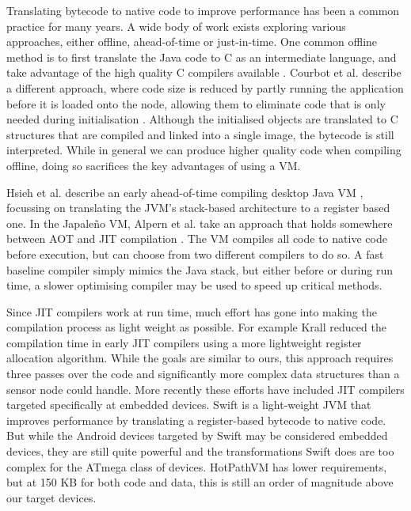 Translating bytecode to native code to improve performance has been a common practice for many years. A wide body of work exists exploring various approaches, either offline, ahead-of-time  or just-in-time. One common offline method is to first translate the Java code to C as an intermediate language, and take advantage of the high quality C compilers available \cite{Dean:1996wb, Muller:1997}. Courbot et al. describe a different approach, where code size is reduced by partly running the application before it is loaded onto the node, allowing them to eliminate code that is only needed during initialisation \cite{Courbot:2010}. Although the initialised objects are translated to C structures that are compiled and linked into a single image, the bytecode is still interpreted. While in general we can produce higher quality code when compiling offline, doing so sacrifices the key advantages of using a VM.

Hsieh et al. describe an early ahead-of-time compiling desktop Java VM \cite{Hsieh:1996cy}, focussing on translating the JVM's stack-based architecture to a register based one. In the Japale\~no VM, Alpern et al. take an approach that holds somewhere between AOT and JIT compilation \cite{Alpern:1999}. The VM compiles all code to native code before execution, but can choose from two different compilers to do so. A fast baseline compiler simply mimics the Java stack, but either before or during run time, a slower optimising compiler may be used to speed up critical methods.

Since JIT compilers work at run time, much effort has gone into making the compilation process as light weight as possible. For example Krall \cite{Krall:1998} reduced the compilation time in early JIT compilers using a more lightweight register allocation algorithm. While the goals are similar to ours, this approach requires three passes over the code and significantly more complex data structures than a sensor node could handle. More recently these efforts have included JIT compilers targeted specifically at embedded devices. Swift \cite{Zhang:2012wf} is a light-weight JVM that improves performance by translating a register-based bytecode to native code. But while the Android devices targeted by Swift may be considered embedded devices, they are still quite powerful and the transformations Swift does are too complex for the ATmega class of devices. HotPathVM \cite{Gal:2006} has lower requirements, but at 150 KB for both code and data, this is still an order of magnitude above our target devices.

